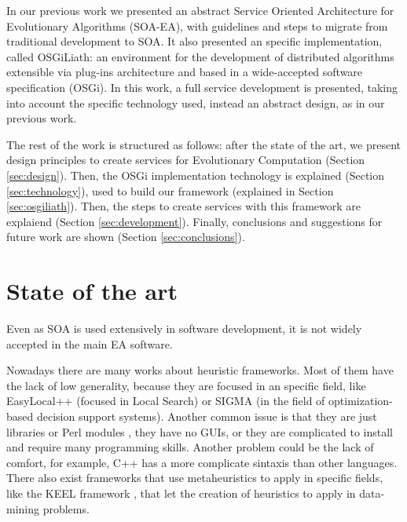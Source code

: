 \documentclass{sig-alternate}
\begin{document}
In our previous work \cite{OSGILIATH} we presented an abstract Service Oriented Architecture for Evolutionary Algorithms (SOA-EA), with guidelines and steps to migrate from traditional development to SOA. It also presented an specific implementation, called OSGiLiath: an environment for the development of distributed algorithms extensible via plug-ins architecture and based in a wide-accepted software specification (OSGi). In this work, a full service development is presented, taking into account the specific technology used, instead an abstract design, as in our previous work.

The rest of the work is structured as follows: after the state of
the art, we present design principles to create services for Evolutionary Computation (Section \ref{sec:design}). Then, the OSGi implementation technology is explained (Section \ref{sec:technology}), used to build our framework (explained in Section \ref{sec:osgiliath}). Then, the steps to create services with this framework are explaiend (Section \ref{sec:development}). Finally, conclusions and suggestions for future work are shown (Section \ref{sec:conclusions}).


%
\section{State of the art}
\label{sec:soa}
%
Even as SOA is used extensively in software development, it is not widely accepted in the main EA software. 

Nowadays there are many works about heuristic
frameworks. Most of them have the lack of low generality, because they
are focused in an specific field, like EasyLocal++ \cite{EASYLOCAL} (focused in Local Search) or
SIGMA \cite{SIGMA} (in the field of optimization-based decision support systems). Another common issue is that they are just libraries
 or Perl modules \cite{PERL}, they have no GUIs, or they are complicated to
install and require many programming skills. Another problem could be
the lack of comfort, for example, C++ has a more complicate sintaxis
than other languages. There also exist frameworks that use metaheuristics to apply in specific fields, like the KEEL framework \cite{KEEL}, that let the creation of heuristics to apply in data-mining problems.
\end{document}
